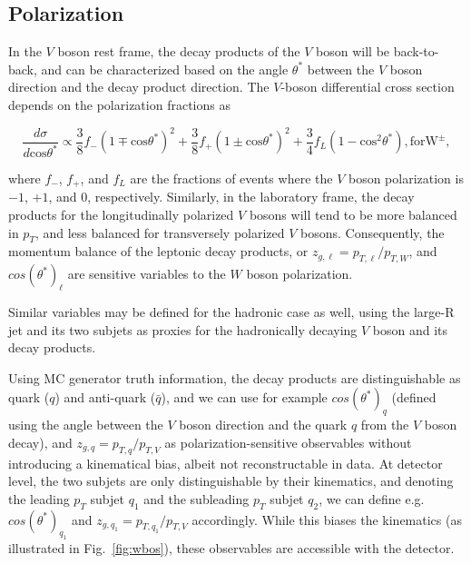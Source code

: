 \documentclass[amsmath,amssymb,aps,prd,preprint,groupedaddress]{revtex4-2}
\begin{document}
\subsection{Polarization}


In the $V$ boson rest frame, the decay products of the $V$ boson will be back-to-back, and can be characterized based on the angle $\theta^{*}$ between the $V$ boson direction and the decay product direction. The $V$-boson differential cross section depends on the polarization fractions as

\begin{equation}
\frac{d\sigma}{d \mathrm{cos} \theta^{*}} \propto
 \frac{3}{8} f_{-}(1 \mp \mathrm{cos} \theta^{*})^2 +
\frac{3}{8} f_{+}(1 \pm \mathrm{cos} \theta^{*})^2 + 
\frac{3}{4} f_{L} (1-\mathrm{cos}^2 \theta^{*}), \mathrm{for W^{\pm}},
\end{equation}

where $f_{-}$, $f_{+}$, and $f_{L}$ are the fractions of events where the $V$ boson polarization is $-1$, $+1$, and 0, respectively.
Similarly, in the laboratory frame, the decay products for the longitudinally polarized $V$ bosons will tend to be more balanced in $p_T$, and less balanced for transversely polarized $V$ bosons.
Consequently, the momentum balance of the leptonic decay products, or  $z_{g, \ell} = p_{T,\ell} / p_{T, W}$, and $cos(\theta^{*})_\ell$ are sensitive variables to the $W$ boson polarization.

Similar variables may be defined for the hadronic case as well, using the large-R jet and its two subjets as proxies for the hadronically decaying $V$ boson and its decay products. 

Using MC generator truth information, the decay products are distinguishable as quark ($q$) and anti-quark ($\bar{q}$), and we can use for example $cos(\theta^{*})_{q}$ (defined using the angle between the $V$ boson direction and the quark $q$ from the $V$ boson decay), and $z_{g, q} = p_{T, q} / p_{T, V}$ as polarization-sensitive observables without introducing a kinematical bias, albeit not reconstructable in data. At detector level, the two subjets are only distinguishable by their kinematics, and denoting the leading $p_T$ subjet $q_1$ and the subleading $p_T$ subjet $q_2$, we can define e.g. $cos(\theta^{*})_{q_{1}}$ and $z_{g, q_{1}} = p_{T,q_{1}} / p_{T, V}$ accordingly. While this biases the kinematics (as illustrated in Fig.~\ref{fig:wbos}), these observables are accessible with the detector. 
\end{document}
